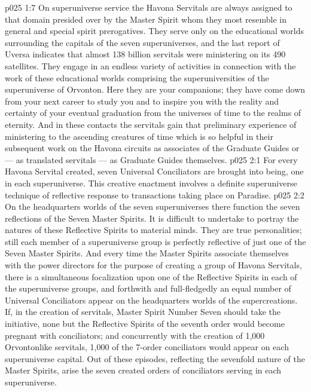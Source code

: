 \vs p025 1:7 On superuniverse service the Havona Servitals are always assigned to that domain presided over by the Master Spirit whom they most resemble in general and special spirit prerogatives. They serve only on the educational worlds surrounding the capitals of the seven superuniverses, and the last report of Uversa indicates that almost 138 billion servitals were ministering on its 490 satellites. They engage in an endless variety of activities in connection with the work of these educational worlds comprising the superuniversities of the superuniverse of Orvonton. Here they are your companions; they have come down from your next career to study you and to inspire you with the reality and certainty of your eventual graduation from the universes of time to the realms of eternity. And in these contacts the servitals gain that preliminary experience of ministering to the ascending creatures of time which is so helpful in their subsequent work on the Havona circuits as associates of the Graduate Guides or --- as translated servitals --- as Graduate Guides themselves.
\vs p025 2:1 For every Havona Servital created, seven Universal Conciliators are brought into being, one in each superuniverse. This creative enactment involves a definite superuniverse technique of reflective response to transactions taking place on Paradise.
\vs p025 2:2 On the headquarters worlds of the seven superuniverses there function the seven reflections of the Seven Master Spirits. It is difficult to undertake to portray the natures of these Reflective Spirits to material minds. They are true personalities; still each member of a superuniverse group is perfectly reflective of just one of the Seven Master Spirits. And every time the Master Spirits associate themselves with the power directors for the purpose of creating a group of Havona Servitals, there is a simultaneous focalization upon one of the Reflective Spirits in each of the superuniverse groups, and forthwith and full\hyp{}fledgedly an equal number of Universal Conciliators appear on the headquarters worlds of the supercreations. If, in the creation of servitals, Master Spirit Number Seven should take the initiative, none but the Reflective Spirits of the seventh order would become pregnant with conciliators; and concurrently with the creation of 1,000 Orvontonlike servitals, 1,000 of the 7\hyp{}order conciliators would appear on each superuniverse capital. Out of these episodes, reflecting the sevenfold nature of the Master Spirits, arise the seven created orders of conciliators serving in each superuniverse.
